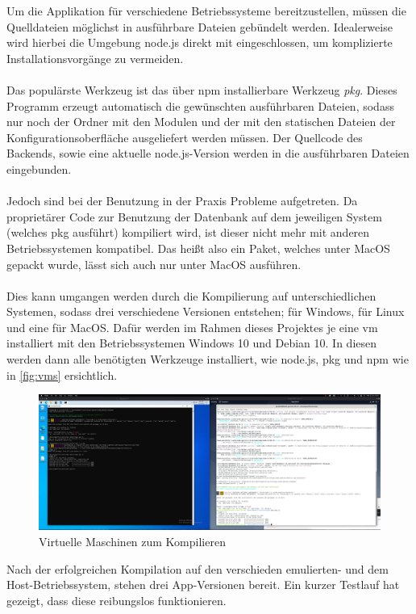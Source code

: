 Um die Applikation für verschiedene Betriebssysteme bereitzustellen, müssen die Quelldateien möglichst in ausführbare Dateien gebündelt werden.
Idealerweise wird hierbei die Umgebung node.js
direkt mit eingeschlossen, um komplizierte Installationsvorgänge zu vermeiden.
\\ \\
Das populärste Werkzeug ist das über \gls{npm} installierbare Werkzeug \textit{pkg}. Dieses Programm erzeugt automatisch die gewünschten ausführbaren Dateien, sodass nur noch der Ordner mit den Modulen und der mit den statischen Dateien der Konfigurationsoberfläche ausgeliefert werden müssen. Der Quellcode des Backends, sowie eine aktuelle node.js-Version werden in die ausführbaren Dateien eingebunden. \cite{igorklopov.2020}
\\ \\
Jedoch sind bei der Benutzung in der Praxis Probleme aufgetreten. Da proprietärer Code zur Benutzung der Datenbank auf dem jeweiligen System (welches pkg ausführt) kompiliert wird, ist dieser nicht mehr mit anderen Betriebssystemen kompatibel. Das heißt also ein Paket, welches unter MacOS gepackt wurde, lässt sich auch nur unter MacOS ausführen. 
\\ \\
Dies kann umgangen werden durch die Kompilierung auf unterschiedlichen Systemen, sodass drei verschiedene Versionen entstehen; für Windows, für Linux und eine für MacOS. Dafür werden im Rahmen dieses Projektes je eine \gls{vm} installiert mit den Betriebssystemen Windows 10 und Debian 10. In diesen werden dann alle benötigten Werkzeuge installiert, wie node.js, pkg und \gls{npm} wie in \autoref{fig:vms} ersichtlich.

\begin{figure}[h]
    \centering
    \includegraphics[width=1.0\textwidth]{figures/crosscompile.png}
    \caption{Virtuelle Maschinen zum Kompilieren}
    \label{fig:vms}
\end{figure}

Nach der erfolgreichen Kompilation auf den verschieden emulierten- und dem Host-Betriebssystem, stehen drei App-Versionen bereit. Ein kurzer Testlauf hat gezeigt, dass diese reibungslos funktionieren.  
